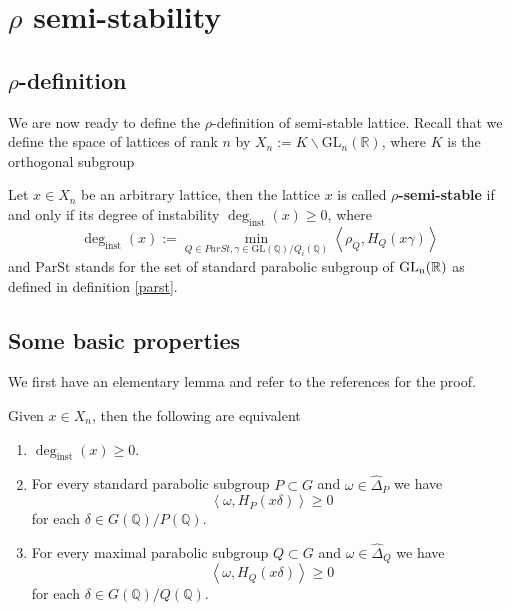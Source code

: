 \section{$\rho$ semi-stability}
\subsection{$\rho$-definition}
We are now ready to define the $\rho$-definition of semi-stable lattice. Recall that
we define the space of lattices of rank $n$ by $X_n := K \backslash \text{GL}_n(\mathbb{R})$, where $K$ is the orthogonal subgroup
\begin{definition}[\label  = $\rho$-definition]\label{ss2}
    Let $x \in X_n$ be an arbitrary lattice, then the lattice $x$ is called \textbf{$\rho$-semi-stable} if and only if its degree of instability $\deg_{\text{inst}}(x)\ge 0$, where
    \[\deg_{\text{inst}}(x):= \min_{Q \in ParSt, \gamma \in \text{GL}(\mathbb{Q})/Q_i(\mathbb{Q})}\left\langle \rho_Q, H_Q(x\gamma) \right\rangle\]
    and $\text{ParSt}$ stands for the set of standard parabolic subgroup of $\operatorname{\text{GL}_n(\mathbb{R})}$ as defined in definition \ref{parst}.
\end{definition}
\subsection{Some basic properties}
We first have an elementary lemma and refer to the references for the proof.
\begin{lemma}\label{ss-equiv}\citetext{\citealp[Lemma 2.2.1]{MR3969872}; \citealp[Proposition 4.2.3]{patnaik2025borel}}

    Given $x \in X_n$, then the following are equivalent
    \begin{enumerate}
        \item $\deg_{\text{inst}}(x) \ge 0$.
        \item For every standard parabolic subgroup $P\subset G$ and $\omega \in \widehat{\Delta}_P$ we have \[\left\langle \omega,H_P(x\delta)\right\rangle \ge 0\] for each $\delta \in G(\mathbb{Q})/P(\mathbb{Q})$.
        \item For every maximal parabolic subgroup $Q\subset G$ and $\omega \in \widehat{\Delta}_Q$ we have \[\left\langle \omega,H_Q(x\delta)\right\rangle \ge 0\] for each $\delta \in G(\mathbb{Q})/Q(\mathbb{Q})$.
    \end{enumerate}
\end{lemma}
